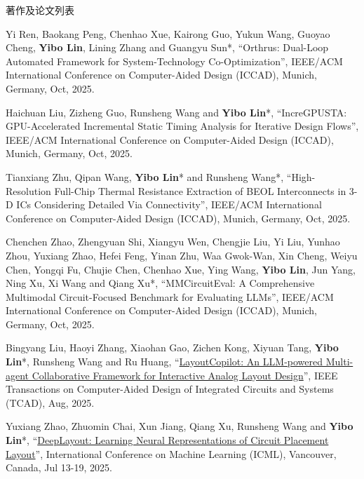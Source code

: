 \begin{rSection}{著作及论文列表}
\begin{description}[font=\normalfont, rightmargin=2em]
\item[{[C195]}]{
        Yi Ren, Baokang Peng, Chenhao Xue, Kairong Guo, Yukun Wang, Guoyao Cheng, \textbf{Yibo Lin}, Lining Zhang and Guangyu Sun*, 
    ``Orthrus: Dual-Loop Automated Framework for System-Technology Co-Optimization'', 
    IEEE/ACM International Conference on Computer-Aided Design (ICCAD), Munich, Germany, Oct, 2025.
    
}
            

\item[{[C194]}]{
        Haichuan Liu, Zizheng Guo, Runsheng Wang and \textbf{Yibo Lin}*, 
    ``IncreGPUSTA: GPU-Accelerated Incremental Static Timing Analysis for Iterative Design Flows'', 
    IEEE/ACM International Conference on Computer-Aided Design (ICCAD), Munich, Germany, Oct, 2025.
    
}
            

\item[{[C193]}]{
        Tianxiang Zhu, Qipan Wang, \textbf{Yibo Lin}* and Runsheng Wang*, 
    ``High-Resolution Full-Chip Thermal Resistance Extraction of BEOL Interconnects in 3-D ICs Considering Detailed Via Connectivity'', 
    IEEE/ACM International Conference on Computer-Aided Design (ICCAD), Munich, Germany, Oct, 2025.
    
}
            

\item[{[C192]}]{
        Chenchen Zhao, Zhengyuan Shi, Xiangyu Wen, Chengjie Liu, Yi Liu, Yunhao Zhou, Yuxiang Zhao, Hefei Feng, Yinan Zhu, Waa Gwok-Wan, Xin Cheng, Weiyu Chen, Yongqi Fu, Chujie Chen, Chenhao Xue, Ying Wang, \textbf{Yibo Lin}, Jun Yang, Ning Xu, Xi Wang and Qiang Xu*, 
    ``MMCircuitEval: A Comprehensive Multimodal Circuit-Focused Benchmark for Evaluating LLMs'', 
    IEEE/ACM International Conference on Computer-Aided Design (ICCAD), Munich, Germany, Oct, 2025.
    
}
            

\item[{[J191]}]{
        Bingyang Liu, Haoyi Zhang, Xiaohan Gao, Zichen Kong, Xiyuan Tang, \textbf{Yibo Lin}*, Runsheng Wang and Ru Huang, 
    ``\href{https://doi.org/10.1109/TCAD.2025.3529805}{LayoutCopilot: An LLM-powered Multi-agent Collaborative Framework for Interactive Analog Layout Design}'', 
    IEEE Transactions on Computer-Aided Design of Integrated Circuits and Systems (TCAD), Aug, 2025.
    
}
            

\item[{[C190]}]{
        Yuxiang Zhao, Zhuomin Chai, Xun Jiang, Qiang Xu, Runsheng Wang and \textbf{Yibo Lin}*, 
    ``\href{https://openreview.net/forum?id=XAlUoJFFQR}{DeepLayout: Learning Neural Representations of Circuit Placement Layout}'', 
    International Conference on Machine Learning (ICML), Vancouver, Canada, Jul 13-19, 2025.
    
}
\end{description}
\end{rSection}
